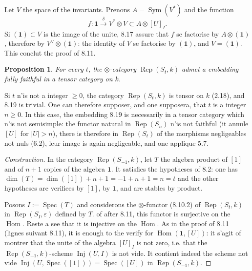 \documentclass[11pt,a4paper]{article}
\theoremstyle{plain}
\newtheorem{proposition}[theorem]{Proposition}
\theoremstyle{definition}
\DeclareMathOperator{\Hom}{Hom}
\DeclareMathOperator{\Spec}{Spec}
\DeclareMathOperator{\Sym}{Sym}
\DeclareMathOperator{\Rep}{Rep}
\DeclareMathOperator{\Inj}{Inj}
\newcommand{\eps}{\varepsilon}
\begin{document}
Let $V$ the space of the invariants. Prenons $A = \Sym(V^*)$ and the function
\[
f : \mathbf{1} \xrightarrow{\delta} V^* \otimes V \subset A \otimes [U]_I.
\]
Si $(\mathbf{1}) \subset V$ is the image of the unite, 8.17 assure that $f$ se factorise by $A \otimes (\mathbf{1})$, therefore by $V^\vee \otimes (\mathbf{1})$: the identity of $V$ se factorise by $(\mathbf{1})$, and $V = (\mathbf{1})$. This conclut the proof of 8.11.

\begin{proposition}
For every $t$, the $\otimes$-category $\Rep(S_t, k)$ admet a embedding fully faithful in a tensor category on $k$.
\end{proposition}

Si $t$ n'is not a integer $\geq 0$, the category $\Rep(S_t, k)$ is tensor on $k$ (2.18), and 8.19 is trivial. One can therefore supposer, and one supposera, that $t$ is a integer $n \geq 0$. In this case, the embedding 8.19 is necessarily in a tensor category which n'is not semisimple: the functor natural in $\Rep(S_n)$ n'is not faithful (it annule $[U]$ for $|U| > n$), there is therefore in $\Rep(S_t)$ of the morphisms negligeables not nuls (6.2), leur image is again negligeable, and one applique 5.7.

\begin{proof}[Construction]
In the category $\Rep(S_{-1}, k)$, let $T$ the algebra product of $[1]$ and of $n + 1$ copies of the algebra $\mathbf{1}$. It satisfies the hypotheses of 8.2: one has $\dim(T) = \dim([1]) + n + 1 = -1 + n + 1 = n = t$ and the other hypotheses are verifiees by $[1]$, by $\mathbf{1}$, and are stables by product.

Posons $I := \Spec(T)$ and considerons the $\otimes$-functor (8.10.2) of $\Rep(S_t, k)$ in $\Rep(S_I, \eps)$ defined by $T$. of after 8.11, this functor is surjective on the $\Hom$. Reste a see that it is injective on the $\Hom$. As in the proof of 8.11 (lignes suivant 8.11), it is enough to the verify for $\Hom(\mathbf{1}, [U])$: it s'agit of montrer that the unite of the algebra $[U]_I$ is not zero, i.e. that the $\Rep(S_{-1}, k)$-scheme $\Inj(U, I)$ is not vide. It contient indeed the scheme not vide $\Inj(U, \Spec([1])) = \Spec([U])$ in $\Rep(S_{-1}, k)$.
\end{proof}
\end{document}
